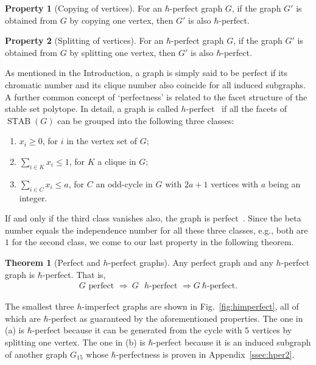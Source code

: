 \documentclass[
12pt,
prx,
aps,
reprint,
a4paper,
longbibliograph,
nofootinbib,
nobibnotes,
superscriptaddress
]{revtex4-2}
\theoremstyle{definition}
\newtheorem{theorem}{Theorem}
\newtheorem{prop}{Property}
\def\stab{\operatorname{STAB}}
\begin{document}
\begin{prop}[Copying of vertices]
\label{thm:copy}
    For an $\hbar$-perfect graph $G$, if the graph $G'$ is obtained from $G$ by copying one vertex, then $G'$ is also $\hbar$-perfect.
\end{prop}

\begin{prop}[Splitting of vertices]
\label{thm:splitting}
    For an $\hbar$-perfect graph $G$, if the graph $G'$ is obtained from $G$ by splitting one vertex, then $G'$ is also $\hbar$-perfect.
\end{prop}

As mentioned in the Introduction, a graph is simply said to be perfect if its chromatic number and its clique number also coincide for all induced subgraphs. 
A further common concept of `perfectness' is related to the facet structure of the stable set polytope. In detail, a graph is called $h$-perfect~\cite{chvatal1975certain,fonlupt1982transformations} if all the facets of $\stab(G)$ can be grouped into the following three classes:
    \begin{enumerate}
        \item $x_i \ge 0$, for $i$ in the vertex set of $G$;
        \item $\sum_{i\in K} x_i \le 1$, for $K$ a clique in $G$;
        \item $\sum_{i\in C} x_i \le a$, for $C$ an odd-cycle in $G$ with $2a+1$ vertices with $a$ being an integer.
     \end{enumerate}
If and only if the third class vanishes also, the graph is perfect~\cite{chvatal1975certain}.
Since the beta number equals the independence number for all these three classes, e.g., both are $1$ for the second class, we come to our last property in the following theorem. 
\begin{theorem}[Perfect and $h$-perfect graphs]
\label{thm:perfect}
    Any perfect graph and any $h$-perfect graph is $\hbar$-perfect. That is,
    \begin{align}
      G \text{ perfect } \Rightarrow \ G \text{ $h$-perfect } \Rightarrow G\ \text{$\hbar$-perfect}.
    \end{align}
\end{theorem}
The smallest three $h$-imperfect graphs are shown in Fig.~\ref{fig:himperfect}, all of which are $\hbar$-perfect as guaranteed by the aforementioned properties. The one in (a) is $\hbar$-perfect because it can be generated from the cycle with $5$ vertices by splitting one vertex.
The one in (b) is $\hbar$-perfect because it is an induced subgraph of another graph $G_{15}$ whose $\hbar$-perfectness is proven in Appendix~\ref{ssec:hper2}.
\end{document}
